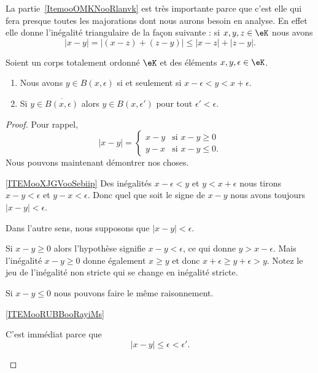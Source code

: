 \begin{remark}      \label{RemooJCAUooKkuglX}
    La partie~\ref{ItemooOMKNooRlanvk} est très importante parce que c'est elle qui fera presque toutes les majorations dont nous aurons besoin en analyse. En effet elle donne l'inégalité triangulaire de la façon suivante : si \( x,y,z\in \eK\) nous avons
    \begin{equation}
        | x-y |= |  (x-z)+(z-y) |\leq | x-z |+| z-y |.
    \end{equation}
\end{remark}

\begin{lemma}
    Soient un corps totalement ordonné \( \eK\) et des éléments \( x,y,\epsilon\in \eK\).
    \begin{enumerate}
        \item       \label{ITEMooXJGVooSebiip}
            Nous avons \( y\in B(x,\epsilon)\) si et seulement si \( x-\epsilon<y<x+\epsilon\).
        \item       \label{ITEMooRUBBooRayiMs}
            Si \( y\in  \overline{ B(x,\epsilon) }  \) alors \( y\in B(x,\epsilon')\) pour tout \( \epsilon'<\epsilon\).
    \end{enumerate}
\end{lemma}

\begin{proof}
    Pour rappel,
    \begin{equation}
        | x-y |=\begin{cases}
               x-y    &     \text{si } x-y\geq 0 \\
                    y-x    &    \text{si } x-y\leq 0.
               \end{cases}
    \end{equation}
    Nous pouvons maintenant démontrer nos choses.
    \begin{subproof}
        \item[\ref{ITEMooXJGVooSebiip}]
            Des inégalités \( x-\epsilon<y\) et \( y<x+\epsilon\) nous tirons \( x-y<\epsilon\) et \( y-x<\epsilon\). Donc quel que soit le signe de \( x-y\) nous avons toujours \( | x-y |<\epsilon\).

            Dans l'autre sens, nous supposons que \( | x-y |<\epsilon\).

            Si \( x-y\geq 0\) alors l'hypothèse signifie \( x-y<\epsilon\), ce qui donne \( y>x-\epsilon\). Mais l'inégalité \( x-y\geq 0\) donne également \( x\geq y\) et donc \( x+\epsilon\geq y+\epsilon>y\). Notez le jeu de l'inégalité non stricte qui se change en inégalité stricte.

            Si \( x-y\leq 0\) nous pouvons faire le même raisonnement.

        \item[\ref{ITEMooRUBBooRayiMs}]

            C'est immédiat parce que
            \begin{equation}
                | x-y |\leq \epsilon<\epsilon'.
            \end{equation}
    \end{subproof}
\end{proof}

